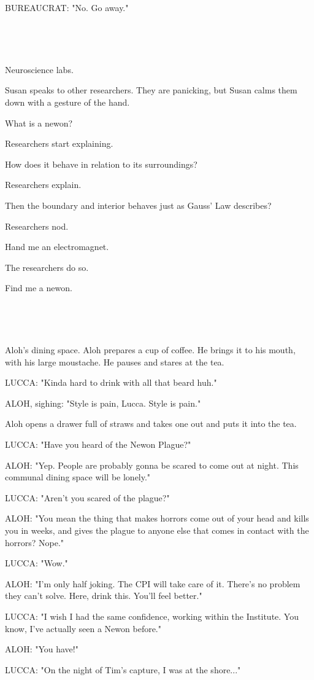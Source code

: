 \documentclass[11pt]{article}
\begin{document}
BUREAUCRAT: "No. Go away."

\ 

\ 

Neuroscience labs.

Susan speaks to other researchers.
They are panicking, but Susan calms them down with a gesture of the hand.

What is a newon?

Researchers start explaining.

How does it behave in relation to its surroundings?

Researchers explain.

Then the boundary and interior behaves just as Gauss' Law describes?

Researchers nod.

Hand me an electromagnet.

The researchers do so.

Find me a newon.

\ 

\ 

Aloh's dining space.
Aloh prepares a cup of coffee.
He brings it to his mouth, with his large moustache.
He pauses and stares at the tea.

LUCCA: "Kinda hard to drink with all that beard huh."

ALOH, sighing: "Style is pain, Lucca. 
Style is pain."

Aloh opens a drawer full of straws and takes one out and puts it into the tea.

LUCCA: "Have you heard of the Newon Plague?"

ALOH: "Yep. People are probably gonna be scared to come out at night.
This communal dining space will be lonely."

LUCCA: "Aren't you scared of the plague?"

ALOH: "You mean the thing that makes horrors come out of your head and kills you in weeks, and gives the plague to anyone else that comes in contact with the horrors? 
Nope."

LUCCA: "Wow."

ALOH: "I'm only half joking.
The CPI will take care of it.
There's no problem they can't solve.
Here, drink this. 
You'll feel better."

LUCCA: "I wish I had the same confidence, working within the Institute.
You know, I've actually seen a Newon before."

ALOH: "You have!"

LUCCA: "On the night of Tim's capture, I was at the shore..."
\end{document}
